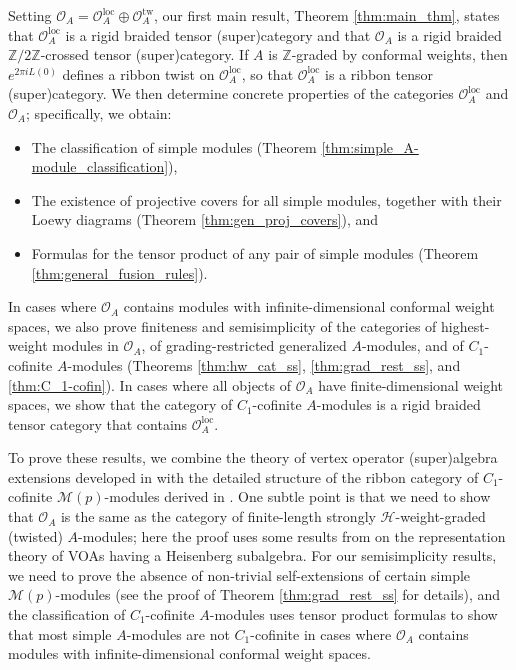 \documentclass[11pt, reqno]{amsart}
\theoremstyle{definition}\newtheorem{defi}[thm]{Definition}
\theoremstyle{definition}\newtheorem{rem}[thm]{Remark}
\theoremstyle{definition}\newtheorem{exam}[thm]{Example}
\theoremstyle{definition}\newtheorem{assum}[thm]{Assumption}
\newcommand{\cH}{\mathcal{H}}
\newcommand{\cM}{\mathcal{M}}
\newcommand{\cO}{\mathcal{O}}
\newcommand{\ZZ}{\mathbb{Z}}
\newcommand{\Oloc}{\cO^{\mathrm{loc}}}
\newcommand{\Otw}{\cO^{\mathrm{tw}}}
\begin{document}
 Setting $\cO_A = \Oloc_A \oplus \Otw_A$, our first main result, Theorem \ref{thm:main_thm}, states that $\Oloc_A$ is a rigid braided tensor (super)category and that $\cO_A$ is a rigid braided $\ZZ/2\ZZ$-crossed tensor (super)category. 
If $A$ is $\ZZ$-graded by conformal weights, then $e^{2\pi i L(0)}$ defines a ribbon twist on $\Oloc_A$, so that $\Oloc_A$ is a ribbon tensor (super)category. We then determine concrete properties of the categories $\Oloc_A$ and $\cO_A$; specifically, we obtain:
 \begin{itemize}
\item The classification of simple modules (Theorem \ref{thm:simple_A-module_classification}),

\item The existence of projective covers for all simple modules, together with their Loewy diagrams (Theorem \ref{thm:gen_proj_covers}), and

\item Formulas for the tensor product of any pair of simple modules (Theorem \ref{thm:general_fusion_rules}).

\end{itemize}
In cases where $\cO_A$ contains modules with infinite-dimensional conformal weight spaces, we also prove finiteness and semisimplicity of the categories of highest-weight modules in $\cO_A$, of grading-restricted generalized $A$-modules, and of $C_1$-cofinite $A$-modules (Theorems \ref{thm:hw_cat_ss}, \ref{thm:grad_rest_ss}, and \ref{thm:C_1-cofin}). In cases where all objects of $\cO_A$ have finite-dimensional weight spaces, we show that the category of $C_1$-cofinite $A$-modules is a rigid braided tensor category that contains $\Oloc_A$.

To prove these results, we combine the theory of vertex operator (super)algebra extensions developed in \cite{HKL, CKL, CKM-exts, CMY-completions} with the detailed structure of the ribbon category of $C_1$-cofinite $\cM(p)$-modules derived in \cite{CMY-singlet, CMY-singlet-typical}. One subtle point is that we need to show that $\cO_A$ is the same as the category of finite-length strongly $\cH$-weight-graded (twisted) $A$-modules; here the proof uses some results from \cite{CKLR} on the representation theory of VOAs having a Heisenberg subalgebra. For our semisimplicity results, we need to prove the absence of non-trivial self-extensions of certain simple $\cM(p)$-modules (see the proof of Theorem \ref{thm:grad_rest_ss} for details), and the classification of $C_1$-cofinite $A$-modules uses tensor product formulas to show that most simple $A$-modules are not $C_1$-cofinite in cases where $\cO_A$ contains modules with infinite-dimensional conformal weight spaces.
\end{document}
